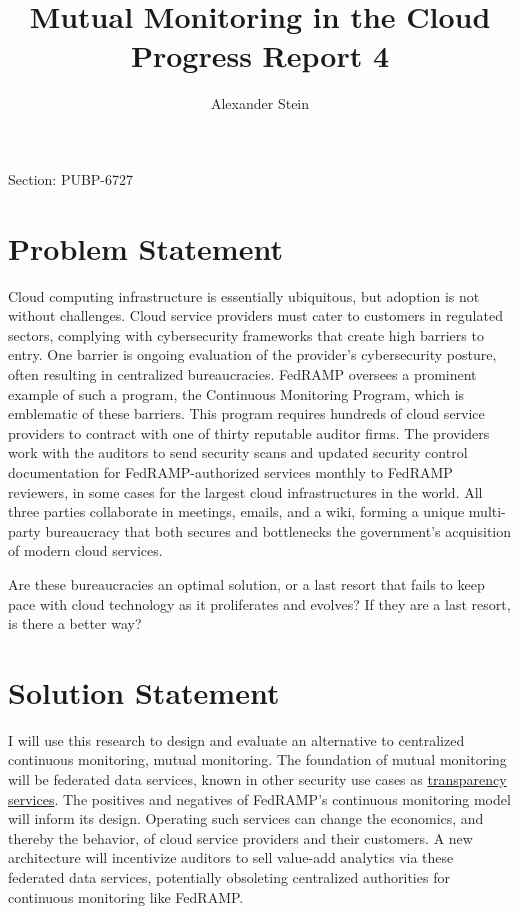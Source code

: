 \documentclass{jdf}
\begin{document}
Section: PUBP-6727
\title{Mutual Monitoring in the Cloud \\ Progress Report 4}
\author{Alexander Stein}

\maketitle
\thispagestyle{fancy}


\section*{Problem Statement}

Cloud computing infrastructure is essentially ubiquitous, but adoption is not without challenges. Cloud service providers must cater to customers in regulated sectors, complying with cybersecurity frameworks that create high barriers to entry. One barrier is ongoing evaluation of the provider's cybersecurity posture, often resulting in centralized bureaucracies. FedRAMP oversees a prominent example of such a program, the Continuous Monitoring Program, which is emblematic of these barriers. This program requires hundreds of cloud service providers to contract with one of thirty reputable auditor firms. The providers work with the auditors to send security scans and updated security control documentation for FedRAMP-authorized services monthly to FedRAMP reviewers, in some cases for the largest cloud infrastructures in the world. All three parties collaborate in meetings, emails, and a wiki, forming a unique multi-party bureaucracy that both secures and bottlenecks the government's acquisition of modern cloud services.

Are these bureaucracies an optimal solution, or a last resort that fails to keep pace with cloud technology as it proliferates and evolves? If they are a last resort, is there a better way?

\section*{Solution Statement}

I will use this research to design and evaluate an alternative to centralized continuous monitoring, mutual monitoring. The foundation of mutual monitoring will be federated data services, known in other security use cases as \hyperlink{https://transparency.dev}{transparency services}. The positives and negatives of FedRAMP's continuous monitoring model will inform its design. Operating such services can change the economics, and thereby the behavior, of cloud service providers and their customers. A new architecture will incentivize auditors to sell value-add analytics via these federated data services, potentially obsoleting centralized authorities for continuous monitoring like FedRAMP.
\end{document}
